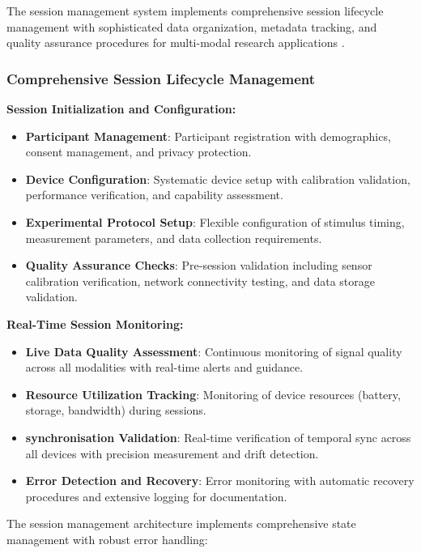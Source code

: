 \documentclass[11pt,a4paper]{report}
\begin{document}
The session management system implements comprehensive session lifecycle management with sophisticated data organization, metadata tracking, and quality assurance procedures for multi-modal research applications \cite{Wilson2014}. 

\subsubsection{Comprehensive Session Lifecycle Management}

\textbf{Session Initialization and Configuration:}
\begin{itemize}
  \item \textbf{Participant Management}: Participant registration with demographics, consent management, and privacy protection.
  \item \textbf{Device Configuration}: Systematic device setup with calibration validation, performance verification, and capability assessment.
  \item \textbf{Experimental Protocol Setup}: Flexible configuration of stimulus timing, measurement parameters, and data collection requirements.
  \item \textbf{Quality Assurance Checks}: Pre-session validation including sensor calibration verification, network connectivity testing, and data storage validation.
\end{itemize}

\textbf{Real-Time Session Monitoring:}
\begin{itemize}
  \item \textbf{Live Data Quality Assessment}: Continuous monitoring of signal quality across all modalities with real-time alerts and guidance.
  \item \textbf{Resource Utilization Tracking}: Monitoring of device resources (battery, storage, bandwidth) during sessions.
  \item \textbf{synchronisation Validation}: Real-time verification of temporal sync across all devices with precision measurement and drift detection.
  \item \textbf{Error Detection and Recovery}: Error monitoring with automatic recovery procedures and extensive logging for documentation.
\end{itemize}

The session management architecture implements comprehensive state management with robust error handling:
\end{document}
